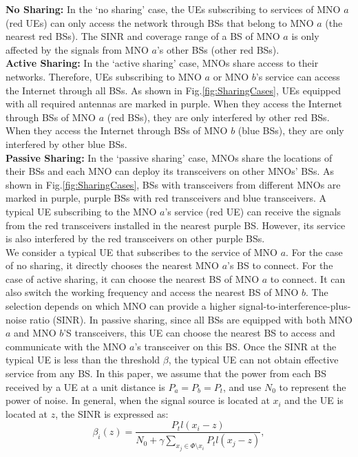 \documentclass[final]{IEEEtran}
\begin{document}
    \indent \textbf{No Sharing:} In the `no sharing' case, the UEs subscribing to services of MNO $a$ (red UEs) can only access the network through BSs that belong to MNO $a$ (the nearest red BSs). The SINR and coverage range of a BS of MNO $a$ is only affected by the signals from MNO $a$'s other BSs (other red BSs).\\
    \indent \textbf{Active Sharing:} In the `active sharing' case, MNOs share access to their networks. Therefore, UEs subscribing to MNO $a$ or MNO $b$'s service can access the Internet through all BSs. As shown in Fig.\ref{fig:SharingCases}, UEs equipped with all required antennas are marked in purple. When they access the Internet through BSs of MNO $a$ (red BSs), they are only interfered by other red BSs. When they access the Internet through BSs of MNO $b$ (blue BSs), they are only interfered by other blue BSs.\\
    \indent \textbf{Passive Sharing:} In the `passive sharing' case, MNOs share the locations of their BSs and each MNO can deploy its transceivers on other MNOs' BSs. As shown in Fig.\ref{fig:SharingCases}, BSs with transceivers from different MNOs are marked in purple, \ie purple BSs with red transceivers and blue transceivers. A typical UE subscribing to the MNO $a$'s service (red UE) can receive the signals from the red transceivers installed in the nearest purple BS. However, its service is also interfered by the red transceivers on other purple BSs. \\
\indent We consider a typical UE that subscribes to the service of MNO $a$. For the case of no sharing, it directly chooses the nearest MNO $a$'s BS to connect. For the case of active sharing, it can choose the nearest BS of MNO $a$ to connect. It can also switch the working frequency and access the nearest BS of MNO $b$. The selection depends on which MNO can provide a higher signal-to-interference-plus-noise ratio (SINR). In passive sharing, since all BSs are equipped with both MNO $a$ and MNO $b$'S transceivers, this UE can choose the nearest BS to access and communicate with the MNO $a$'s transceiver on this BS. Once the SINR at the typical UE is less than the threshold $\beta$, the typical UE can not obtain effective service from any BS. In this paper, we assume that the power from each BS received by a UE at a unit distance is $P_{a}=P_{b}=P_t$, and use $N_0$ to represent the power of noise. In general, when the signal source is located at $x_i$ and the UE is located at $z$, the SINR is expressed as:
\begin{equation}
    \beta_i(z)=\frac{P_t l(x_i-z)}{N_0+\gamma\sum\limits_{x_j\in \Phi\setminus x_i}P_t l(x_j-z)},
\label{betaiz}
\end{equation}
\end{document}
